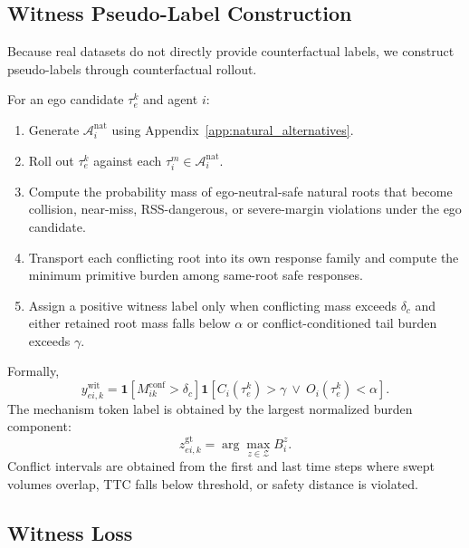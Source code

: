 \documentclass[10pt]{article}
\begin{document}
\subsection{Witness Pseudo-Label Construction}
\label{app:witness_supervision}

Because real datasets do not directly provide counterfactual labels, we construct pseudo-labels through counterfactual rollout.

For an ego candidate $\tau^k_e$ and agent $i$:
\begin{enumerate}
    \item Generate $\mathcal{A}^{\mathrm{nat}}_i$ using Appendix~\ref{app:natural_alternatives}.
    \item Roll out $\tau^k_e$ against each $\tau_i^{m}\in\mathcal{A}^{\mathrm{nat}}_i$.
    \item Compute the probability mass of ego-neutral-safe natural roots that become collision, near-miss, RSS-dangerous, or severe-margin violations under the ego candidate.
    \item Transport each conflicting root into its own response family and compute the minimum primitive burden among same-root safe responses.
    \item Assign a positive witness label only when conflicting mass exceeds $\delta_c$ and either retained root mass falls below $\alpha$ or conflict-conditioned tail burden exceeds $\gamma$.
\end{enumerate}

Formally,
\begin{equation}
    y^{\mathrm{wit}}_{ei,k}
    =
    \mathbf{1}\!\left[M^{\mathrm{conf}}_{ik}>\delta_c\right]
    \mathbf{1}\!\left[C_i(\tau^k_e)>\gamma\ \vee\ O_i(\tau^k_e)<\alpha\right].
\end{equation}
The mechanism token label is obtained by the largest normalized burden component:
\begin{equation}
    z^{\mathrm{gt}}_{ei,k}
    =
    \arg\max_{z\in\mathcal{Z}}
    B^z_i .
\end{equation}
Conflict intervals are obtained from the first and last time steps where swept volumes overlap, TTC falls below threshold, or safety distance is violated.

\subsection{Witness Loss}
\label{app:witness_loss}
\end{document}
